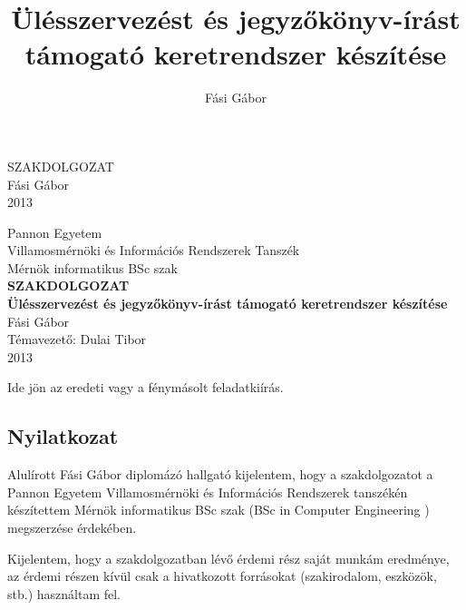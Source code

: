 \documentclass[a4paper,12pt,oneside]{report}
\title{Ülésszervezést és jegyzőkönyv-írást támogató keretrendszer készítése}
\author{Fási Gábor}
\date{}
\begin{document}
\setcounter{chapter}{1}

\pagestyle{empty}
{
    \begin{center}
    \vspace*{5cm}
    {
        \Huge SZAKDOLGOZAT}\\
        \vspace*{10cm}
        {\LARGE Fási Gábor}\\
        \vspace*{3cm}
        {\LARGE 2013}
    \end{center}
}
\newpage

\begin{center}
{
    \Large Pannon Egyetem\\
    Villamosmérnöki és Információs Rendszerek
Tanszék\vspace*{3mm}\\
    Mérnök informatikus BSc szak
}
    \vspace*{2cm}\\
    {\LARGE \bf SZAKDOLGOZAT}
    \vspace{3cm}\\
    {\LARGE\bf Ülésszervezést és jegyzőkönyv-írást támogató keretrendszer   készítése}
    \vspace{3cm}\\
    {\large Fási Gábor}
    \vspace{6cm}
    \\
    {\large Témavezető: Dulai Tibor}
    \vspace{1cm}\\
    {\large 2013}
\end{center}
\normalsize
\newpage

Ide jön az eredeti vagy a fénymásolt feladatkiírás.
\newpage

\begin{center}
\section*{Nyilatkozat}
\end{center}

Alulírott Fási Gábor diplomázó hallgató kijelentem, hogy a szakdolgozatot a Pannon Egyetem Villamosmérnöki és Információs Rendszerek tanszékén készítettem Mérnök informatikus BSc szak (BSc in Computer Engineering
) megszerzése érdekében.

Kijelentem, hogy a szakdolgozatban lévő érdemi rész saját munkám eredménye, az érdemi részen kívül csak a hivatkozott forrásokat (szakirodalom, eszközök, stb.) használtam fel.
\end{document}
